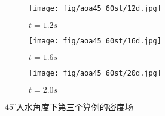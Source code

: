 \begin{figure}[!htp]
  \begin{subfigure}{0.25\textwidth}
    \centering
    \texttt{[image: fig/aoa45\_60st/12d.jpg]}
    \caption{$t = 1.2s$}
  \end{subfigure}
  \hspace{1cm}
  \begin{subfigure}{0.25\textwidth}
    \centering
    \texttt{[image: fig/aoa45\_60st/16d.jpg]}
    \caption{$t = 1.6s$}
  \end{subfigure}
  \hspace{1cm}
  \begin{subfigure}{0.25\textwidth}
    \centering
    \texttt{[image: fig/aoa45\_60st/20d.jpg]}
    \caption{$t = 2.0s$}
  \end{subfigure}

  \caption{$45^\circ$入水角度下第三个算例的密度场}
  \label{fig:detail_45_d}
\end{figure}


